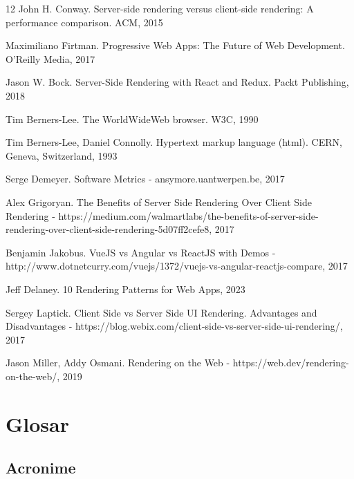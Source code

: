 \documentclass[12pt, a4paper]{report}
\begin{document}
\begin{thebibliography} {12}
	 John H. Conway. Server-side rendering versus client-side rendering: A performance comparison. ACM, 2015

	 Maximiliano Firtman. Progressive Web Apps: The Future of Web Development. O'Reilly Media, 2017

	 Jason W. Bock. Server-Side Rendering with React and Redux. Packt Publishing, 2018

	 Tim Berners-Lee. The WorldWideWeb browser. W3C, 1990

	 Tim Berners-Lee, Daniel Connolly. Hypertext markup language (html). CERN, Geneva, Switzerland, 1993

	 Serge Demeyer. Software Metrics - ansymore.uantwerpen.be, 2017

	 Alex Grigoryan. The Benefits of Server Side Rendering Over Client Side Rendering - https://medium.com/walmartlabs/the-benefits-of-server-side-rendering-over-client-side-rendering-5d07ff2cefe8, 2017

	 Benjamin Jakobus. VueJS vs Angular vs ReactJS with Demos - http://www.dotnetcurry.com/vuejs/1372/vuejs-vs-angular-reactjs-compare, 2017

	 Jeff Delaney. 10 Rendering Patterns for Web Apps, 2023

	 Sergey Laptick. Client Side vs Server Side UI Rendering. Advantages and Disadvantages - https://blog.webix.com/client-side-vs-server-side-ui-rendering/, 2017

	 Jason Miller, Addy Osmani. Rendering on the Web - https://web.dev/rendering-on-the-web/, 2019


\end{thebibliography}


\appendix %

\chapter{Glosar}


\section{Acronime}
\end{document}
